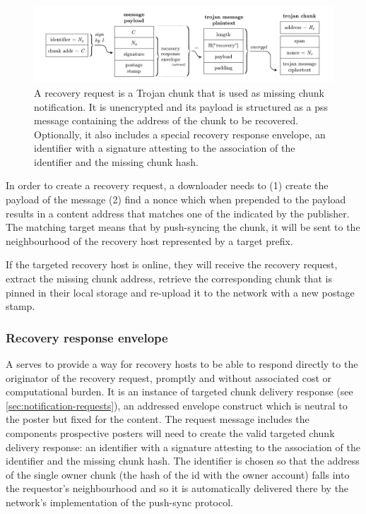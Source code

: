 \begin{figure}[htbp]
  \centering
  \includegraphics[width=\textwidth]{fig/recovery-request.pdf}
  \caption[Recovery request \statusgreen]{A recovery request is a Trojan chunk that is used as missing chunk notification. It is unencrypted and its payload is structured as a pss message containing the address of the chunk to be recovered. Optionally, it also includes a special recovery response envelope, an identifier with a signature attesting to the association of the identifier and the missing chunk hash.}
  \label{fig:recovery-request}
\end{figure}

In order to create a recovery request, a downloader needs to (1) create the payload of the message (2) find a nonce which when prepended to the payload results in a content address that matches one of the  indicated by the publisher. The matching target means that by push-syncing the chunk, it will be sent to the neighbourhood of the recovery host represented by a target prefix. 

If the targeted recovery host is online, they will receive the recovery request, extract the missing chunk address, retrieve the corresponding chunk that is pinned in their local storage and re-upload it to the network with a new postage stamp.

\subsubsection{Recovery response envelope}

A  serves to provide a way for recovery hosts to be able to respond directly to the originator of the recovery request, promptly and without associated cost or computational burden. It is an instance of targeted chunk delivery response (see \ref{sec:notification-requests}), an addressed envelope construct which is neutral to the poster but fixed for the content. The request message includes the components prospective posters will need to create the valid targeted chunk delivery response: an identifier with a signature attesting to the association of the identifier and the missing chunk hash. The identifier is chosen so that the address of the single owner chunk (the hash of the id with the owner account) falls into the requestor's neighbourhood and so it is automatically delivered there by the network's implementation of the push-sync protocol.

